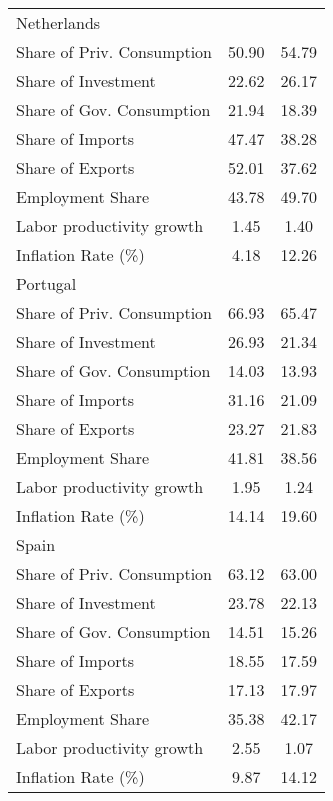 \begin{center}
\begin{longtable}{lcc}
Netherlands &  &  \\  
Share of Priv. Consumption &     50.90 &     54.79 \\  
Share of Investment &     22.62 &     26.17 \\  
Share of Gov. Consumption &     21.94 &     18.39 \\  
Share of Imports &     47.47 &     38.28 \\  
Share of Exports &     52.01 &     37.62 \\  
Employment Share &     43.78 &     49.70 \\  
Labor productivity growth &      1.45 &      1.40 \\  
Inflation Rate (\%) &      4.18 &     12.26 \\  
Portugal &  &  \\  
Share of Priv. Consumption &     66.93 &     65.47 \\  
Share of Investment &     26.93 &     21.34 \\  
Share of Gov. Consumption &     14.03 &     13.93 \\  
Share of Imports &     31.16 &     21.09 \\  
Share of Exports &     23.27 &     21.83 \\  
Employment Share &     41.81 &     38.56 \\  
Labor productivity growth &      1.95 &      1.24 \\  
Inflation Rate (\%) &     14.14 &     19.60 \\  
Spain &  &  \\  
Share of Priv. Consumption &     63.12 &     63.00 \\  
Share of Investment &     23.78 &     22.13 \\  
Share of Gov. Consumption &     14.51 &     15.26 \\  
Share of Imports &     18.55 &     17.59 \\  
Share of Exports &     17.13 &     17.97 \\  
Employment Share &     35.38 &     42.17 \\  
Labor productivity growth &      2.55 &      1.07 \\  
Inflation Rate (\%) &      9.87 &     14.12 \\  
\hline \hline \end{longtable} 
\end{center}
